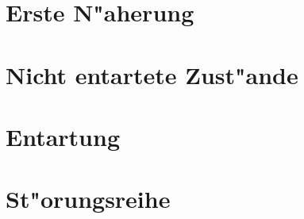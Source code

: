 \section{Erste N"aherung}


\section{Nicht entartete Zust"ande}

\section{Entartung}

\section{St"orungsreihe}
